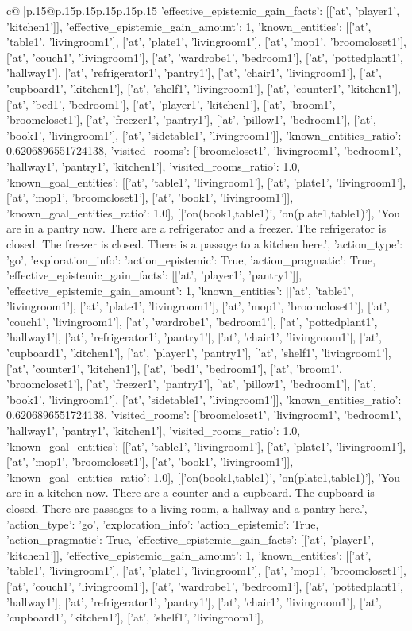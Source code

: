 \documentclass{article}
\begin{document}
{\begin{supertabular}{c@{$\;$}|p{.15\linewidth}@{}p{.15\linewidth}p{.15\linewidth}p{.15\linewidth}p{.15\linewidth}p{.15\linewidth}}
{{{'effective_epistemic_gain_facts': [['at', 'player1', 'kitchen1']], 'effective_epistemic_gain_amount': 1, 'known_entities': [['at', 'table1', 'livingroom1'], ['at', 'plate1', 'livingroom1'], ['at', 'mop1', 'broomcloset1'], ['at', 'couch1', 'livingroom1'], ['at', 'wardrobe1', 'bedroom1'], ['at', 'pottedplant1', 'hallway1'], ['at', 'refrigerator1', 'pantry1'], ['at', 'chair1', 'livingroom1'], ['at', 'cupboard1', 'kitchen1'], ['at', 'shelf1', 'livingroom1'], ['at', 'counter1', 'kitchen1'], ['at', 'bed1', 'bedroom1'], ['at', 'player1', 'kitchen1'], ['at', 'broom1', 'broomcloset1'], ['at', 'freezer1', 'pantry1'], ['at', 'pillow1', 'bedroom1'], ['at', 'book1', 'livingroom1'], ['at', 'sidetable1', 'livingroom1']], 'known_entities_ratio': 0.6206896551724138, 'visited_rooms': ['broomcloset1', 'livingroom1', 'bedroom1', 'hallway1', 'pantry1', 'kitchen1'], 'visited_rooms_ratio': 1.0, 'known_goal_entities': [['at', 'table1', 'livingroom1'], ['at', 'plate1', 'livingroom1'], ['at', 'mop1', 'broomcloset1'], ['at', 'book1', 'livingroom1']], 'known_goal_entities_ratio': 1.0}}], [['on(book1,table1)', 'on(plate1,table1)'], 'You are in a pantry now. There are a refrigerator and a freezer. The refrigerator is closed. The freezer is closed. There is a passage to a kitchen here.', {'action_type': 'go', 'exploration_info': {'action_epistemic': True, 'action_pragmatic': True, 'effective_epistemic_gain_facts': [['at', 'player1', 'pantry1']], 'effective_epistemic_gain_amount': 1, 'known_entities': [['at', 'table1', 'livingroom1'], ['at', 'plate1', 'livingroom1'], ['at', 'mop1', 'broomcloset1'], ['at', 'couch1', 'livingroom1'], ['at', 'wardrobe1', 'bedroom1'], ['at', 'pottedplant1', 'hallway1'], ['at', 'refrigerator1', 'pantry1'], ['at', 'chair1', 'livingroom1'], ['at', 'cupboard1', 'kitchen1'], ['at', 'player1', 'pantry1'], ['at', 'shelf1', 'livingroom1'], ['at', 'counter1', 'kitchen1'], ['at', 'bed1', 'bedroom1'], ['at', 'broom1', 'broomcloset1'], ['at', 'freezer1', 'pantry1'], ['at', 'pillow1', 'bedroom1'], ['at', 'book1', 'livingroom1'], ['at', 'sidetable1', 'livingroom1']], 'known_entities_ratio': 0.6206896551724138, 'visited_rooms': ['broomcloset1', 'livingroom1', 'bedroom1', 'hallway1', 'pantry1', 'kitchen1'], 'visited_rooms_ratio': 1.0, 'known_goal_entities': [['at', 'table1', 'livingroom1'], ['at', 'plate1', 'livingroom1'], ['at', 'mop1', 'broomcloset1'], ['at', 'book1', 'livingroom1']], 'known_goal_entities_ratio': 1.0}}], [['on(book1,table1)', 'on(plate1,table1)'], 'You are in a kitchen now. There are a counter and a cupboard. The cupboard is closed. There are passages to a living room, a hallway and a pantry here.', {'action_type': 'go', 'exploration_info': {'action_epistemic': True, 'action_pragmatic': True, 'effective_epistemic_gain_facts': [['at', 'player1', 'kitchen1']], 'effective_epistemic_gain_amount': 1, 'known_entities': [['at', 'table1', 'livingroom1'], ['at', 'plate1', 'livingroom1'], ['at', 'mop1', 'broomcloset1'], ['at', 'couch1', 'livingroom1'], ['at', 'wardrobe1', 'bedroom1'], ['at', 'pottedplant1', 'hallway1'], ['at', 'refrigerator1', 'pantry1'], ['at', 'chair1', 'livingroom1'], ['at', 'cupboard1', 'kitchen1'], ['at', 'shelf1', 'livingroom1'], }}}
\end{supertabular}}
\end{document}
